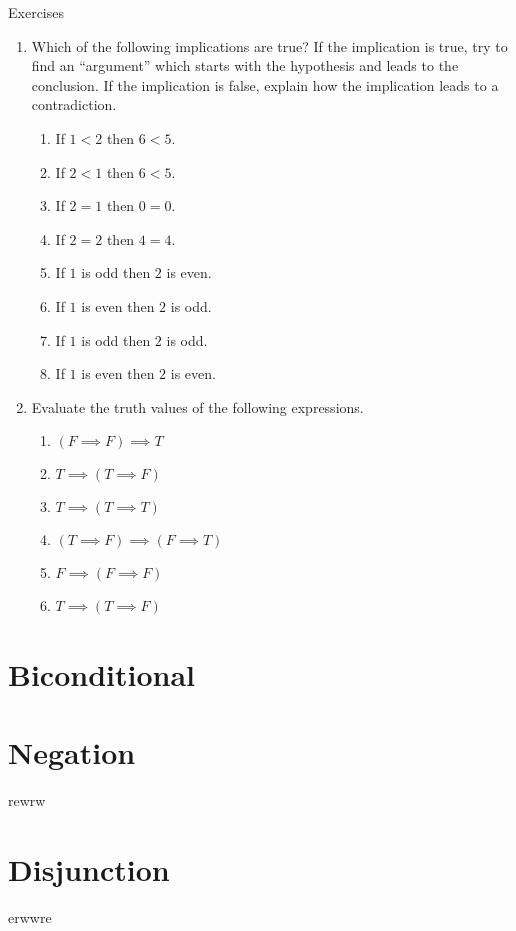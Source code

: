 \begin{xcb}{Exercises}
	
	\begin{enumerate}
		\item Which of the following implications are true?  If the implication is true, try to find an ``argument'' which starts with the hypothesis and leads to the conclusion.  If the implication is false, explain how the implication leads to a contradiction.
		\begin{enumerate}
			\item If $1<2$ then $6<5$.
			\item If $2<1$ then $6<5$.
			\item If $2 = 1$ then $0 = 0$.
			\item If $2 = 2$ then $4 = 4$.
			\item If $1$ is odd then $2$ is even.
			\item If $1$ is even then $2$ is odd.
			\item If $1$ is odd then $2$ is odd.
			\item If $1$ is even then $2$ is even. 
		\end{enumerate}
		\item Evaluate the truth values of the following expressions.
		\begin{enumerate}
			\item $(F \implies F) \implies T$
			\item $T \implies (T \implies F)$
			\item $T \implies (T \implies T)$
			\item $(T \implies F) \implies (F \implies T)$
			\item $F \implies (F \implies F)$
			\item $T \implies (T \implies F)$
		\end{enumerate}
	\end{enumerate}
	
\end{xcb}

\section{Biconditional}


\section{Negation}

rewrw
\section{Disjunction}




erwwre



